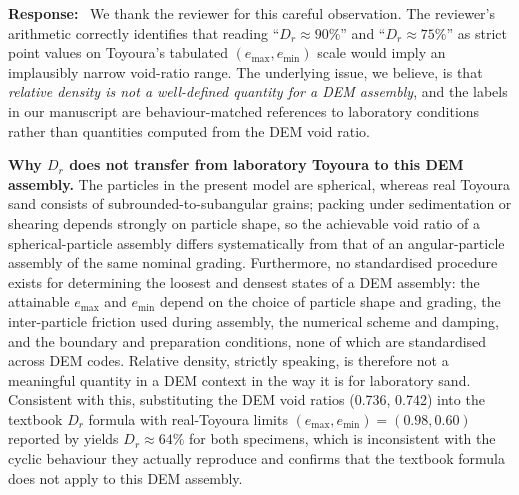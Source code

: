 \documentclass[11pt,a4paper]{article}
\newcommand{\response}{\par\noindent\textbf{Response:}\ \ignorespaces}
\begin{document}
\response
We thank the reviewer for this careful observation. The reviewer's
arithmetic correctly identifies that reading
``$D_r \approx 90\%$'' and ``$D_r \approx 75\%$'' as strict point
values on Toyoura's tabulated $(e_{\max}, e_{\min})$ scale would
imply an implausibly narrow void-ratio range. The underlying issue,
we believe, is that \emph{relative density is not a well-defined
quantity for a DEM assembly}, and the labels in our manuscript are
behaviour-matched references to laboratory conditions rather than
quantities computed from the DEM void ratio.

\medskip
\noindent\textbf{Why $D_r$ does not transfer from laboratory
Toyoura to this DEM assembly.}
The particles in the present model are spherical, whereas real
Toyoura sand consists of subrounded-to-subangular grains; packing
under sedimentation or shearing depends strongly on particle shape,
so the achievable void ratio of a spherical-particle assembly
differs systematically from that of an angular-particle assembly of
the same nominal grading. Furthermore, no standardised procedure
exists for determining the loosest and densest states of a DEM
assembly: the attainable $e_{\max}$ and $e_{\min}$ depend on the
choice of particle shape and grading, the inter-particle friction
used during assembly, the numerical scheme and damping, and the
boundary and preparation conditions, none of which are standardised
across DEM codes. Relative density, strictly speaking, is therefore
not a meaningful quantity in a DEM context in the way it is for
laboratory sand. Consistent with this, substituting the DEM void
ratios (0.736, 0.742) into the textbook $D_r$ formula with
real-Toyoura limits $(e_{\max}, e_{\min})=(0.98, 0.60)$ reported by
\citet{Ishihara1985} yields $D_r \approx 64\%$ for both
specimens, which is inconsistent with the cyclic behaviour they
actually reproduce and confirms that the textbook formula does not apply
to this DEM assembly.
\end{document}
